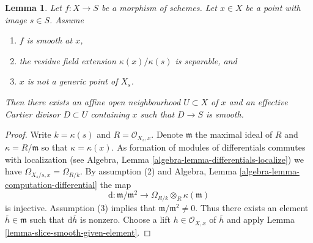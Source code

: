 \documentclass[10pt,a4paper]{amsart}
\theoremstyle{plain}
\newtheorem{lemma}[subsection]{Lemma}
\theoremstyle{definition}
\theoremstyle{remark}
\numberwithin{equation}{subsection}
\begin{document}
\begin{lemma}
\label{lemma-slice-smooth-once-separable-residue-field-extension}
Let $f : X \to S$ be a morphism of schemes.
Let $x \in X$ be a point with image $s \in S$.
Assume
\begin{enumerate}
\item $f$ is smooth at $x$,
\item the residue field extension $\kappa(x)/\kappa(s)$
is separable, and
\item $x$ is not a generic point of $X_s$.
\end{enumerate}
Then there exists an affine open neighbourhood $U \subset X$ of $x$
and an effective Cartier divisor $D \subset U$ containing $x$ such that
$D \to S$ is smooth.
\end{lemma}

\begin{proof}
Write $k = \kappa(s)$ and $R = \mathcal{O}_{X_s, x}$.
Denote $\mathfrak m$ the maximal ideal of $R$ and
$\kappa = R/\mathfrak m$ so that $\kappa = \kappa(x)$.
As formation of modules of differentials commutes with localization (see
Algebra, Lemma \ref{algebra-lemma-differentials-localize})
we have $\Omega_{X_s/s, x} = \Omega_{R/k}$. By assumption (2) and
Algebra, Lemma \ref{algebra-lemma-computation-differential}
the map
$$
\text{d} :
\mathfrak m/\mathfrak m^2
\longrightarrow
\Omega_{R/k} \otimes_R \kappa(\mathfrak m)
$$
is injective. Assumption (3) implies that
$\mathfrak m/\mathfrak m^2 \not = 0$.
Thus there exists an element $\overline{h} \in \mathfrak m$
such that $\text{d}\overline{h}$ is nonzero. Choose a lift
$h \in \mathcal{O}_{X, x}$ of $\overline{h}$ and apply
Lemma \ref{lemma-slice-smooth-given-element}.
\end{proof}
\end{document}
